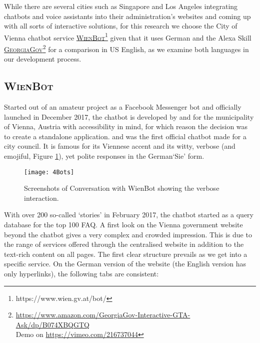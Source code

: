 	While there are several cities such as Singapore and Los Angeles integrating chatbots and voice assistants into their administration's websites and coming up with all sorts of interactive solutions,
	for this research we choose the City of Vienna chatbot service \href{https://www.wien.gv.at/bot/}{\textsc{WienBot}\footnote{\url{https://www.wien.gv.at/bot/}}} given that it uses German 
	and the Alexa Skill \href{https://www.amazon.com/GeorgiaGov-Interactive-GTA-Ask/dp/B074XBQGTQ}{\textsc{GeorgiaGov}}\footnote{\url{https://www.amazon.com/GeorgiaGov-Interactive-GTA-Ask/dp/B074XBQGTQ}\\ Demo on \url{https://vimeo.com/216737044}} for a comparison in US English, as we examine both languages in our development process.

\subsection*{\textsc{WienBot}}
Started out of an amateur project as a Facebook Messenger bot and officially launched in December 2017, the chatbot is developed by and for the municipality of Vienna, Austria with accessibility in mind, for which reason the decision was to create a standalone application. %
and was the first official chatbot made for a city council. It is famous for its Viennese accent and its witty, verbose (and emojiful, Figure \ref{wienbot:introscreenshots}), yet polite responses in the German`Sie' form.




\begin{figure}[H]

	\caption[Conversation with WienBot]{Screenshots of Conversation with WienBot showing the verbose interaction.}
	\label{wienbot:introscreenshots}
	\texttt{[image: 4Bots]}
\end{figure}

With over 200 so-called `stories' in February 2017, the chatbot started as a query database for the top 100 FAQ.
A first look on the Vienna government website beyond the chatbot gives a very complex and crowded impression. This is due to the range of services offered through the centralised website in addition to the text-rich content on all pages. The first clear structure prevails as we get into a specific service. On the German version of the website (the English version has only hyperlinks), the following tabs are consistent:



